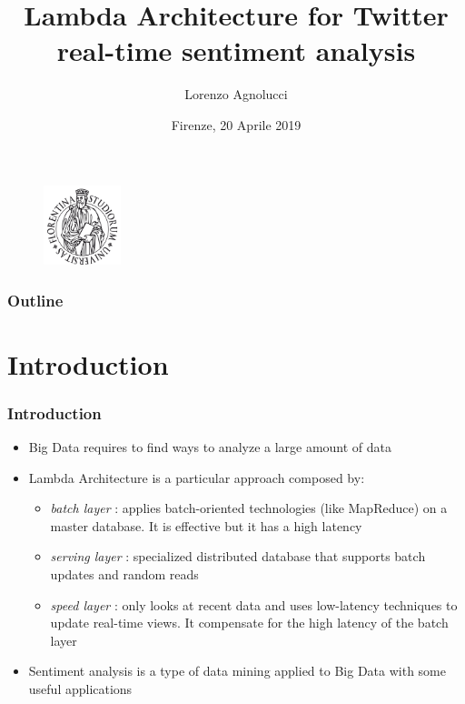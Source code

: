 \documentclass[xcolor=table, unknownkeysallowed]{beamer}
\title[Twitter real-time sentiment analysis]{Lambda Architecture for Twitter real-time sentiment analysis} %
\author{Lorenzo Agnolucci} %
\institute[] %
{
Universit\`a degli Studi di Firenze \\ %
Dipartimento di Ingegneria dell'Informazione \\
}
\date{Firenze, 20 Aprile 2019} %
\begin{document}
\begin{frame}
\titlepage %
\begin{figure}
    \centering
    \includegraphics[width=0.2\textwidth]{img/stemma.pdf}
\end{figure}
\end{frame}


\begin{frame}
\frametitle{Outline}
\tableofcontents
\end{frame}


\section{Introduction}

\begin{frame}
\frametitle{Introduction}
\begin{itemize}
\item Big Data requires to find ways to analyze a large amount of data
\vspace{0.25cm}
\item Lambda Architecture is a particular approach composed by:
\vspace{0.15cm}

\begin{itemize}
\item \emph{batch layer} : applies batch-oriented technologies (like MapReduce) on a master database. It is effective but it has a high latency
\vspace{0.15cm}
\item \emph{serving layer} : specialized distributed database that supports batch updates and random reads
\vspace{0.15cm}
\item \emph{speed layer} : only looks at recent data and uses low-latency techniques to update real-time views. It compensate for the high latency of the batch layer
\end{itemize}
\vspace{0.25cm}

\item Sentiment analysis is a type of data mining applied to Big Data with some useful applications
\end{itemize}
\end{frame}
\end{document}
